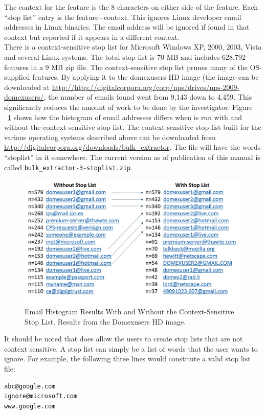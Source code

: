 \documentclass[11pt]{article} %
\begin{document}
The context for the feature is the 8 characters on either side of the feature. Each ``stop list'' entry is the feature+context. This ignores Linux developer email addresses in Linux binaries. The email address will be ignored if found in that context but reported if it appears in a different context. \\

There is a context-sensitive stop list for Microsoft Windows XP, 2000, 2003, Vista and several Linux systems. The total stop list is 70 MB and includes 628,792 features in a 9 MB zip file. The context-sensitive stop list prunes many of the OS-supplied features. By applying it to the domexusers HD image (the image can be downloaded at \url{http://http://digitalcorpora.org/corp/nps/drives/nps-2009-domexusers/}, the number of emails found went from 9,143 down to 4,459. This significantly reduces the amount of work to be done by the investigator. Figure ~\ref{fig:withandwithoutstoplist} shows how the histogram of email addresses differs when \bulk is run with and without the context-sensitive stop list. The context-sensitive stop list built for the various operating systems described above can be downloaded from \url{http://digitalcorpora.org/downloads/bulk_extractor}. The file will have the words ``stoplist'' in it somewhere. The current version as of publication of this manual is called \texttt{bulk\_extractor-3-stoplist.zip}.

\begin{figure}
	\includegraphics[scale=0.65]{otherPics/WithWithoutStopList.jpg}
	\caption{Email Histogram Results With and Without the Context-Sensitive Stop List. Results from the Domexusers HD image.}
	\label{fig:withandwithoutstoplist}
\end{figure}

It should be noted that \bulk does allow the users to create stop lists that are not context sensitive. A stop list can simply be a list of words that the user wants \bulk to ignore. For example, the following three lines would constitute a valid stop list file: 
\begin{verbatim}
abc@google.com
ignore@microsoft.com
www.google.com
\end{verbatim}
\end{document}
